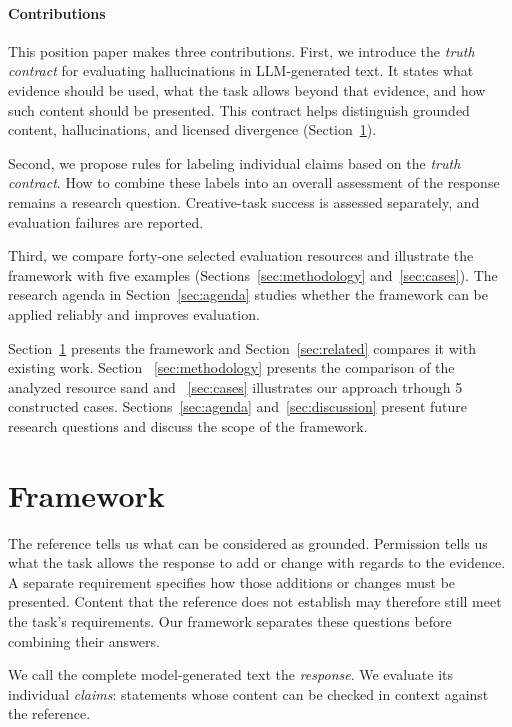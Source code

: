 \documentclass{clv2025}
\begin{document}
\paragraph{Contributions}
This position paper makes three contributions. First, we introduce the
\emph{truth contract} for evaluating hallucinations in LLM-generated text. It states what evidence should be used, what the task
allows beyond that evidence, and how such content should be presented. This
contract helps distinguish grounded content, hallucinations, and licensed
divergence (Section~\ref{sec:framework}).

Second, we propose rules for labeling individual claims based on the \emph{truth contract}.
How to combine these labels into an overall assessment of the response remains a research question. 
Creative-task success is assessed separately, and evaluation failures are reported.

Third, we compare forty-one selected evaluation resources and illustrate the
framework with five examples %
(Sections~\ref{sec:methodology} and~\ref{sec:cases}). %
The research agenda in Section~\ref{sec:agenda} studies whether the framework can be applied reliably and improves evaluation.

Section~\ref{sec:framework} presents the framework and
Section~\ref{sec:related} compares it with existing work.
Section ~\ref{sec:methodology} presents the comparison of the analyzed resource sand and ~\ref{sec:cases}  illustrates our approach trhough 5 constructed cases. Sections~\ref{sec:agenda} and~\ref{sec:discussion}
present future research questions and discuss the scope of the framework.

\section{Framework}\label{sec:framework}

The reference tells us what can be considered as grounded. Permission tells us what the
task allows the response to add or change with regards to the evidence. A separate requirement specifies
how those additions or changes must be presented. Content that the reference
does not establish may therefore still meet the task's requirements.
Our framework separates these questions before combining their answers.

We call the complete model-generated text the \emph{response}. We evaluate
its individual \emph{claims}: statements whose content can be checked in
context against the reference.
\end{document}
